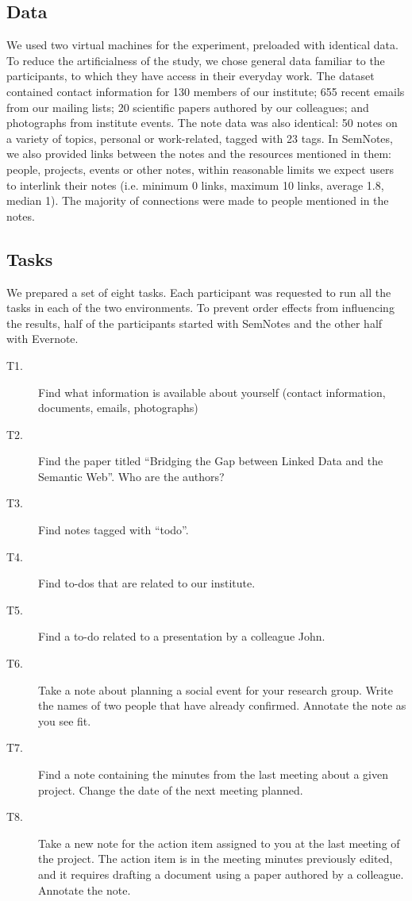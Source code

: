 \subsection{Data} 

We used two virtual machines for the experiment, preloaded with identical data. To reduce the artificialness of the study, we chose general data familiar to the participants, to which they have access in their everyday work. The dataset contained contact information for 130 members of our institute; 655 recent emails from our mailing lists; 20 scientific papers authored by our colleagues; and photographs from institute events. The note data was also identical: 50 notes on a variety of topics, personal or work-related, tagged with 23 tags. In SemNotes, we also provided links between the notes and the resources mentioned in them: people, projects, events or other notes, within reasonable limits we expect users to interlink their notes (i.e. minimum 0 links, maximum 10 links, average 1.8, median 1). The majority of connections were made to people mentioned in the notes.

\subsection{Tasks} 

We prepared a set of eight tasks. Each participant was requested to run all the tasks in each of the two environments. To prevent order effects from influencing the results, half of the participants started with SemNotes and the other half with Evernote.

\begin{description}
 \item[T1.] Find what information is available about yourself (contact information, documents, emails, photographs)
 \item[T2.] Find the paper titled ``Bridging the Gap between Linked Data and the Semantic Web''. Who are the authors?
 \item[T3.] Find notes tagged with ``todo''.
 \item[T4.] Find to-dos that are related to our institute.
 \item[T5.] Find a to-do related to a presentation by a colleague John.
 \item[T6.] Take a note about planning a social event for your research group. Write the names of two people that have already confirmed. Annotate the note as you see fit.
 \item[T7.] Find a note containing the minutes from the last meeting about a given project. Change the date of the next meeting planned.
 \item[T8.] Take a new note for the action item assigned to you at the last meeting of the project. The action item is in the meeting minutes previously edited, and it requires drafting a document using a paper authored by a colleague. Annotate the note.
\end{description}

